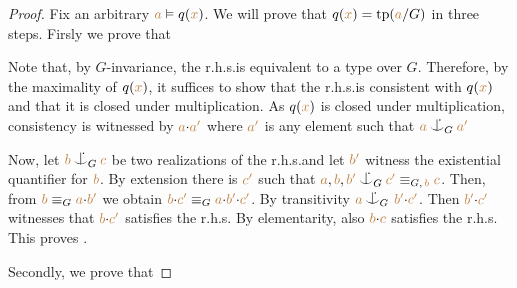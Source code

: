 \documentclass[creche.tex]{subfiles}
\begin{document}
\begin{proof}
Fix an arbitrary ${\color{brown} a}\vDash q({\color{brown} x})$.
We will prove that $q({\color{brown} x})={\rm tp}({\color{brown} a}/G)$ in three steps.
Firsly we prove that


Note that, by $G$-invariance, the r.h.s.\@ is equivalent to a type over $G$.
Therefore, by the maximality of $q({\color{brown} x})$, it suffices to show that the r.h.s.\@ is consistent with $q({\color{brown} x})$ and that it is closed under multiplication.
As $q({\color{brown} x})$ is closed under multiplication, consistency is witnessed by ${\color{brown} a}{\cdot}{\color{brown} a'}$ where ${\color{brown} a'}$ is any element such that ${\mr a}\nonforkc_G{\mr a'}$

Now, let ${\mr b}\nonforkc_G{\mr c}$ be two realizations of the r.h.s.\@ and let ${\color{brown} b'}$ witness the existential quantifier for ${\color{brown} b}$.
By extension there is ${\color{brown} c'}$ such that ${\mr a}, {\mr b}, {\mr b'}\nonforkc_G{\mr c'}\equiv_{G,\,{\mr b}}{\mr c}$.
Then, from ${\color{brown} b}\equiv_G{\color{brown} a}{\cdot}{\color{brown} b'}$ we obtain  ${\color{brown} b}{\cdot}{\color{brown} c'}\equiv_G{\color{brown} a}{\cdot}{\color{brown} b'}{\cdot}{\color{brown} c'}$.
By transitivity ${\mr a}\nonforkc_G\,{\mr b'}{\cdot}{\mr c'}$.
Then ${\color{brown} b'}{\cdot}{\color{brown} c'}$ witnesses that ${\color{brown} b}{\cdot}{\color{brown} c'}$ satisfies the r.h.s.
By elementarity, also ${\color{brown} b}{\cdot}{\color{brown} c}$  satisfies the r.h.s.
This proves .


Secondly, we prove that 



\end{proof}
\end{document}

